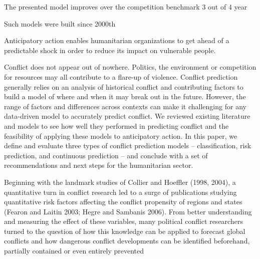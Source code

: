 \documentclass[runningheads]{llncs}
\begin{document}
    The presented model improves over the competition benchmark 3 out of 4 year


    Such models were built since 2000th


    Anticipatory action enables humanitarian organizations to get ahead of a predictable shock in order to reduce its impact on vulnerable people.

    Conflict does not appear out of nowhere. Politics, the environment or competition for resources may all contribute to a flare-up of violence. Conflict prediction generally relies on an analysis of historical conflict and contributing factors to build a model of where and when it may break out in the future. However, the range of factors and differences across contexts can make it challenging for any data-driven model to accurately predict conflict. We reviewed existing literature and models to see how well they performed in predicting conflict and the feasibility of applying these models to anticipatory action. In this paper, we define and evaluate three types of conflict prediction models – classification, risk prediction, and continuous prediction – and conclude with a set of recommendations and next steps for the humanitarian
    sector.


    Beginning with the landmark studies of Collier and Hoeffler (1998, 2004), a quantitative
    turn in conflict research led to a surge of publications studying quantitative risk factors
    affecting the conflict propensity of regions and states (Fearon and Laitin 2003; Hegre and Sambanis 2006). From better understanding and measuring the effect of these variables,
    many political conflict researchers turned to the question of how this knowledge can be
    applied to forecast global conflicts and how dangerous conflict developments can be identified beforehand, partially contained or even entirely prevented
\end{document}
